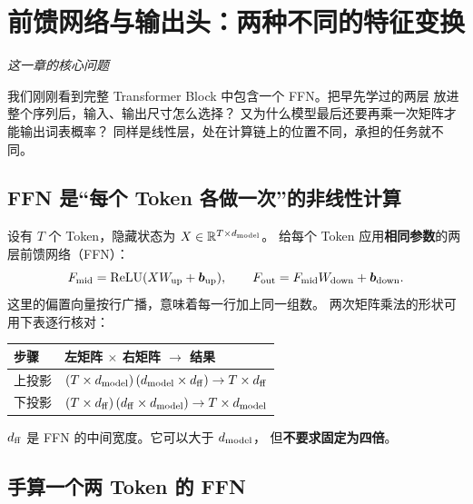 \chapterrule
\section{前馈网络与输出头：两种不同的特征变换}
\label{intro:ffn-output-head}

\begin{idea}
\noindent\emph{这一章的核心问题}\par

我们刚刚看到完整 Transformer Block 中包含一个 FFN。把早先学过的两层  放进整个序列后，输入、输出尺寸怎么选择？
又为什么模型最后还要再乘一次矩阵才能输出词表概率？
同样是线性层，处在计算链上的位置不同，承担的任务就不同。
\end{idea}

\subsection{FFN 是“每个 Token 各做一次”的非线性计算}
\label{concept:ffn}

设有 $T$ 个 Token，隐藏状态为
$X\in\mathbb{R}^{T\times d_{\rm model}}$。
给每个 Token 应用\textbf{相同参数}的两层前馈网络（FFN）：
\begin{equation}
F_{\rm mid}=\operatorname{ReLU}(XW_{\rm up}+\boldsymbol{b}_{\rm up}),\qquad
F_{\rm out}=F_{\rm mid}W_{\rm down}+\boldsymbol{b}_{\rm down}.
\label{eq:ffn-batched}
\end{equation}
这里的偏置向量按行广播，意味着每一行加上同一组数。
两次矩阵乘法的形状可用下表逐行核对：
\begin{center}\small
{}
\begin{tabularx}{\linewidth}{@{}>{\raggedright\arraybackslash}p{25mm}>{\raggedright\arraybackslash}X@{}}
\toprule
步骤 & 左矩阵 $\times$ 右矩阵 $\to$ 结果\\\midrule
上投影 & $(T\times d_{\rm model})\,(d_{\rm model}\times d_{\rm ff})\to T\times d_{\rm ff}$\\
下投影 & $(T\times d_{\rm ff})\,(d_{\rm ff}\times d_{\rm model})\to T\times d_{\rm model}$\\
\bottomrule
\end{tabularx}
\end{center}
$d_{\rm ff}$ 是 FFN 的中间宽度。它可以大于 $d_{\rm model}$，
但\textbf{不要求固定为四倍}。

\subsection{手算一个两 Token 的 FFN}

